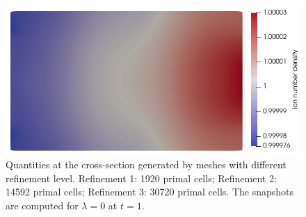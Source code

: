 \documentclass{article}
\begin{document}
\begin{figure}
    \includegraphics[scale=0.27]{slice_ni_T-1_lambda-0_32-3-4.png}
    \caption{Quantities at the cross-section generated by meshes with different refinement level. Refinement 1: 1920 primal cells; Refinement 2: 14592 primal cells; Refinement 3: 30720 primal cells. The snapshots are computed for $\lambda = 0$ at $t = 1$.}
    \label{fig:grid_study_3d_clip_lambda-0}
\end{figure}
\end{document}
